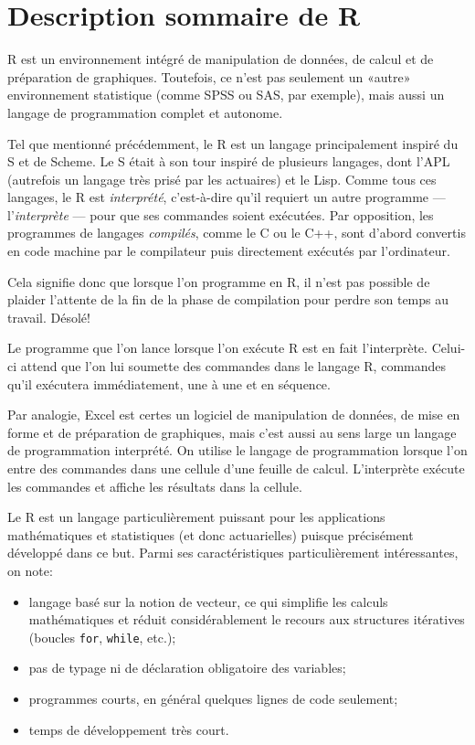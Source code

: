 \documentclass[11pt,article]{memoir}
\begin{document}
\section{Description sommaire de R}
\label{presentation:description}

R est un environnement intégré de manipulation de données, de calcul
et de préparation de graphiques. Toutefois, ce n'est pas seulement un
«autre» environnement statistique (comme SPSS ou SAS, par exemple),
mais aussi un langage de programmation complet et autonome.

Tel que mentionné précédemment, le R est un langage principalement
inspiré du S et de Scheme. Le S était à son
tour inspiré de plusieurs langages, dont l'APL (autrefois un langage
très prisé par les actuaires) et le Lisp. Comme tous ces langages, le
R est \emph{interprété}, c'est-à-dire
qu'il requiert un autre programme --- l'\emph{interprète} --- pour que
ses commandes soient exécutées. Par opposition, les programmes de
langages \emph{compilés}, comme le C ou le
C++, sont d'abord convertis en code machine par le compilateur puis
directement exécutés par l'ordinateur.

Cela signifie donc que lorsque l'on programme en R, il n'est pas
possible de plaider l'attente de la fin de la phase de compilation
pour perdre son temps au travail. Désolé!

Le programme que l'on lance lorsque l'on exécute R est en fait
l'interprète. Celui-ci attend que l'on lui soumette des commandes dans
le langage R, commandes qu'il exécutera immédiatement, une à une et
en séquence.

Par analogie, Excel est certes un logiciel de manipulation de données,
de mise en forme et de préparation de graphiques, mais c'est aussi au
sens large un langage de programmation interprété. On utilise le
langage de programmation lorsque l'on entre des commandes dans une
cellule d'une feuille de calcul. L'interprète exécute les commandes et
affiche les résultats dans la cellule.

Le R est un langage particulièrement puissant pour les applications
mathématiques et statistiques (et donc actuarielles) puisque
précisément développé dans ce but. Parmi ses caractéristiques
particulièrement intéressantes, on note:
\begin{itemize}
\item langage basé sur la notion de vecteur, ce qui simplifie les
  calculs mathématiques et réduit considérablement le recours aux
  structures itératives (boucles \texttt{for}, \texttt{while}, etc.);
\item pas de typage ni de déclaration obligatoire des variables;
\item programmes courts, en général quelques lignes de code seulement;
\item temps de développement très court.
\end{itemize}
\end{document}
